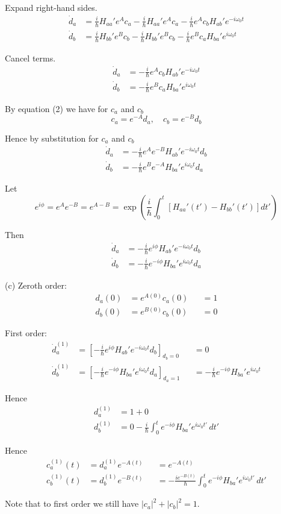 Expand right-hand sides.
\begin{align*}
\dot d_a&=\frac{i}{\hbar}H_{aa}'e^Ac_a
-\frac{i}{\hbar}H_{aa}'e^Ac_a
-\frac{i}{\hbar}e^Ac_bH_{ab}'e^{-i\omega_0t}
\\
\dot d_b&=\frac{i}{\hbar}H_{bb}'e^Bc_b
-\frac{i}{\hbar}H_{bb}'e^Bc_b
-\frac{i}{\hbar}e^Bc_aH_{ba}'e^{i\omega_0t}
\end{align*}

Cancel terms.
\begin{align*}
\dot d_a&=-\frac{i}{\hbar}e^Ac_bH_{ab}'e^{-i\omega_0t}
\\
\dot d_b&=-\frac{i}{\hbar}e^Bc_aH_{ba}'e^{i\omega_0t}
\end{align*}

By equation (2) we have for $c_a$ and $c_b$
\begin{equation*}
c_a=e^{-A}d_a,\quad
c_b=e^{-B}d_b
\end{equation*}

Hence by substitution for $c_a$ and $c_b$
\begin{align*}
\dot d_a&=-\frac{i}{\hbar}e^Ae^{-B}H_{ab}'e^{-i\omega_0t}d_b
\\
\dot d_b&=-\frac{i}{\hbar}e^Be^{-A}H_{ba}'e^{i\omega_0t}d_a
\end{align*}

Let
\begin{equation*}
e^{i\phi}=e^Ae^{-B}=e^{A-B}
=\exp\left(\frac{i}{\hbar}\int_0^t\left[H_{aa}'(t')-H_{bb}'(t')\right]dt'\right)
\end{equation*}

Then
\begin{align*}
\dot d_a&=-\frac{i}{\hbar}e^{i\phi}H_{ab}'e^{-i\omega_0t}d_b
\\
\dot d_b&=-\frac{i}{\hbar}e^{-i\phi}H_{ba}'e^{i\omega_0t}d_a
\end{align*}

(c) Zeroth order:
\begin{align*}
d_a(0)&=e^{A(0)}c_a(0)&&=1
\\
d_b(0)&=e^{B(0)}c_b(0)&&=0
\end{align*}

First order:
\begin{align*}
\dot d_a^{(1)}&=\left[-\frac{i}{\hbar}e^{i\phi}H_{ab}'e^{-i\omega_0t}d_b\right]_{d_b=0}
&&=0
\\
\dot d_b^{(1)}&=\left[-\frac{i}{\hbar}e^{-i\phi}H_{ba}'e^{i\omega_0t}d_a\right]_{d_a=1}
&&=-\frac{i}{\hbar}e^{-i\phi}H_{ba}'e^{i\omega_0t}
\end{align*}

Hence
\begin{align*}
d_a^{(1)}&=1+0
\\
d_b^{(1)}&=0-\frac{i}{\hbar}\int_0^te^{-i\phi}H_{ba}'e^{i\omega_0t'}\,dt'
\end{align*}

Hence
\begin{align*}
c_a^{(1)}(t)&=d_a^{(1)}e^{-A(t)}&&=e^{-A(t)}
\\
c_b^{(1)}(t)&=d_b^{(1)}e^{-B(t)}&&=-\frac{ie^{-B(t)}}{\hbar}\int_0^te^{-i\phi}H_{ba}'e^{i\omega_0t'}\,dt'
\end{align*}

Note that to first order we still have $|c_a|^2+|c_b|^2=1$.


